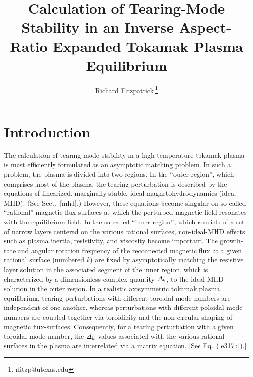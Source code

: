 \documentclass[12pt,prb,aps]{revtex4-1}
\begin{document}
\title{Calculation of Tearing-Mode Stability in an Inverse Aspect-Ratio Expanded Tokamak Plasma Equilibrium}
\author{Richard Fitzpatrick\,\footnote{rfitzp@utexas.edu}}

\maketitle

\section{Introduction} 
The calculation of tearing-mode stability in a high temperature tokamak plasma is most efficiently formulated as  an asymptotic
matching problem.\cite{fkr} In such a problem, the  plasma is  divided into two regions. In the ``outer region'', which comprises most
of the plasma, the tearing perturbation is described by the equations of linearized, marginally-stable, ideal magnetohydrodynamics (ideal-MHD). (See Sect.~\ref{mhd}.)
However, these equations become singular on so-called ``rational'' magnetic flux-surfaces at which the perturbed magnetic field resonates with the equilibrium field. In the so-called ``inner region'', which
consists of a set of narrow layers centered on the various rational surfaces, non-ideal-MHD effects such as plasma inertia, resistivity, and
viscosity become important. The growth-rate and angular rotation frequency of the reconnected magnetic flux at a given rational
surface (numbered $k$) are fixed by asymptotically matching the resistive layer
solution in the associated segment of the inner region, which is characterized by a dimensionless complex quantity ${\mit\Delta}_k$,  to the ideal-MHD solution in the outer region. In a realistic axisymmetric tokamak  plasma equilibrium, tearing
perturbations with different toroidal mode numbers are independent of one another, whereas perturbations with different poloidal
mode numbers are coupled together via toroidicity and the non-circular shaping of magnetic flux-surfaces.\cite{con0}
Consequently, for a tearing perturbation with a given toroidal mode number, 
 the ${\mit\Delta}_k$ values associated with  the various rational surfaces in the plasma are interrelated via a matrix equation.\cite{connor,cht,tokuda,brennan, ham,am1,am3} [See Eq.~(\ref{e317u}).]
\end{document}
